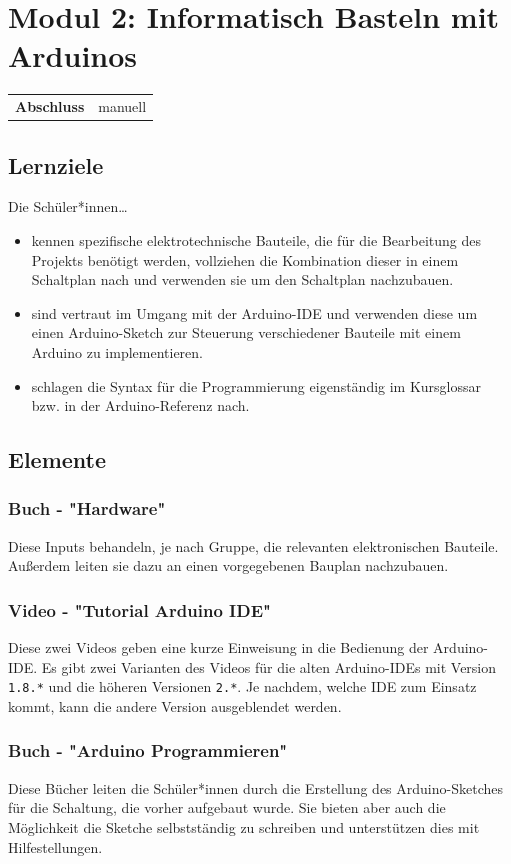 \documentclass[a4paper]{article}
\begin{document}
\section{Modul 2: Informatisch Basteln mit Arduinos}
\begin{tabular}{@{}l l}
    \textbf{Abschluss} & manuell
\end{tabular}

\subsection{Lernziele}
Die Schüler*innen\dots
\begin{itemize}
    \item kennen spezifische elektrotechnische Bauteile, die für die Bearbeitung des Projekts benötigt werden, vollziehen die Kombination dieser in einem Schaltplan nach und verwenden sie um den Schaltplan nachzubauen.
    \item sind vertraut im Umgang mit der Arduino-IDE und verwenden diese um einen Arduino-Sketch zur Steuerung verschiedener Bauteile mit einem Arduino zu implementieren.
    \item schlagen die Syntax für die Programmierung eigenständig im Kursglossar bzw. in der Arduino-Referenz nach.
\end{itemize}

\subsection{Elemente}
\subsubsection{Buch - "Hardware"}
Diese Inputs behandeln, je nach Gruppe, die relevanten elektronischen Bauteile. Außerdem leiten sie dazu an einen vorgegebenen Bauplan nachzubauen.

\subsubsection{Video - "Tutorial Arduino IDE"}
Diese zwei Videos geben eine kurze Einweisung in die Bedienung der Arduino-IDE. Es gibt zwei Varianten des Videos für die alten Arduino-IDEs mit Version \verb|1.8.*| und die höheren Versionen \verb|2.*|. Je nachdem, welche IDE zum Einsatz kommt, kann die andere Version ausgeblendet werden.

\subsubsection{Buch - "Arduino Programmieren"}
Diese Bücher leiten die Schüler*innen durch die Erstellung des Arduino-Sketches für die Schaltung, die vorher aufgebaut wurde. Sie bieten aber auch die Möglichkeit die Sketche selbstständig zu schreiben und unterstützen dies mit Hilfestellungen.
\end{document}
